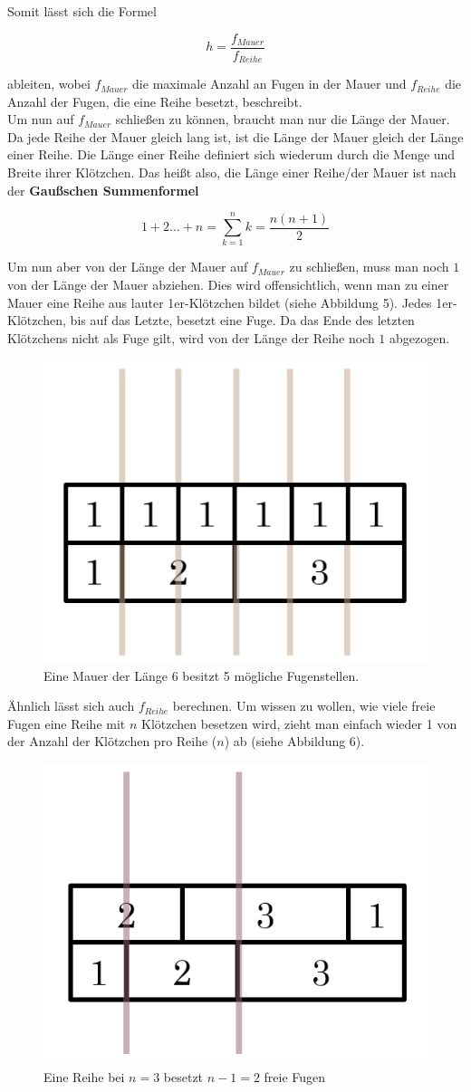 \documentclass[a4paper,12pt]{article}
\begin{document}
Somit lässt sich die Formel
\begin{center}
\begin{Large}
\[h = \frac{f_{Mauer}}{f_{Reihe}}\]
\end{Large}
\end{center}
ableiten, wobei $f_{Mauer}$ die maximale Anzahl an Fugen in der Mauer und $f_{Reihe}$ die Anzahl der Fugen, die eine Reihe besetzt, beschreibt.
\\[0.4cm]
Um nun auf $f_{Mauer}$ schließen zu können, braucht man nur die Länge der Mauer. Da jede Reihe der Mauer gleich lang ist, ist die Länge der Mauer gleich der Länge einer Reihe. Die Länge einer Reihe definiert sich wiederum durch die Menge und Breite ihrer Klötzchen. Das heißt also, die Länge einer Reihe/der Mauer ist nach der \textbf{Gaußschen Summenformel}
\begin{center}
\begin{Large}
\[1+2...+n = \sum_{k=1}^n k = \frac{n(n+1)}{2}\]
\end{Large}
\end{center}
Um nun aber von der Länge der Mauer auf $f_{Mauer}$ zu schließen, muss man noch $1$ von der Länge der Mauer abziehen. Dies wird offensichtlich, wenn man zu einer Mauer eine Reihe aus lauter 1er-Klötzchen bildet (siehe Abbildung 5). Jedes 1er-Klötzchen, bis auf das Letzte, besetzt eine Fuge. Da das Ende des letzten Klötzchens nicht als Fuge gilt, wird von der Länge der Reihe noch $1$ abgezogen.
\begin{figure}[H]
    \centering
    \includegraphics[width=0.4\linewidth]{Bilder/Aufgabe1/Definition_Fugenstellen_Mauer.png}
    \caption{Eine Mauer der Länge 6 besitzt 5 mögliche Fugenstellen.}
\end{figure}

Ähnlich lässt sich auch $f_{Reihe}$ berechnen. Um wissen zu wollen, wie viele freie Fugen eine Reihe mit $n$ Klötzchen besetzen wird, zieht man einfach wieder 1 von der Anzahl der Klötzchen pro Reihe ($n$) ab (siehe Abbildung 6).
\begin{figure}[H]
    \centering
    \includegraphics[width=0.4\linewidth]{Bilder/Aufgabe1/Definition_Fugenstellen_Reihe.png}
    \caption{Eine Reihe bei $n = 3$ besetzt $n-1 = 2$ freie Fugen}
\end{figure}
\end{document}
